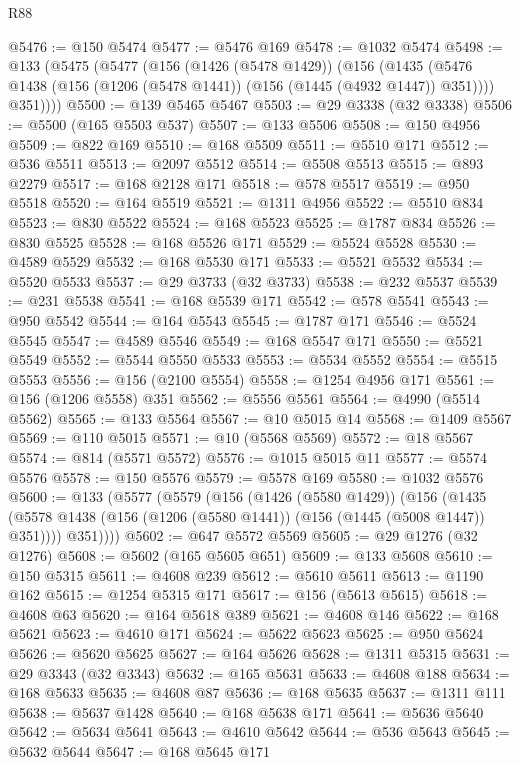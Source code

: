 \begin{lexlean}{R88}
\begin{coremodule}
@5476 := @150 @5474
@5477 := @5476 @169
@5478 := @1032 @5474
@5498 := @133
    (@5475
      (@5477
        (@156
          (@1426 (@5478 @1429))
          (@156
            (@1435 (@5476 @1438 (@156 (@1206 (@5478 @1441)) (@156 (@1445 (@4932 @1447)) @351))))
            @351))))
@5500 := @139 @5465 @5467
@5503 := @29 @3338 (@32 @3338)
@5506 := @5500 (@165 @5503 @537)
@5507 := @133 @5506
@5508 := @150 @4956
@5509 := @822 @169
@5510 := @168 @5509
@5511 := @5510 @171
@5512 := @536 @5511
@5513 := @2097 @5512
@5514 := @5508 @5513
@5515 := @893 @2279
@5517 := @168 @2128 @171
@5518 := @578 @5517
@5519 := @950 @5518
@5520 := @164 @5519
@5521 := @1311 @4956
@5522 := @5510 @834
@5523 := @830 @5522
@5524 := @168 @5523
@5525 := @1787 @834
@5526 := @830 @5525
@5528 := @168 @5526 @171
@5529 := @5524 @5528
@5530 := @4589 @5529
@5532 := @168 @5530 @171
@5533 := @5521 @5532
@5534 := @5520 @5533
@5537 := @29 @3733 (@32 @3733)
@5538 := @232 @5537
@5539 := @231 @5538
@5541 := @168 @5539 @171
@5542 := @578 @5541
@5543 := @950 @5542
@5544 := @164 @5543
@5545 := @1787 @171
@5546 := @5524 @5545
@5547 := @4589 @5546
@5549 := @168 @5547 @171
@5550 := @5521 @5549
@5552 := @5544 @5550 @5533
@5553 := @5534 @5552
@5554 := @5515 @5553
@5556 := @156 (@2100 @5554)
@5558 := @1254 @4956 @171
@5561 := @156 (@1206 @5558) @351
@5562 := @5556 @5561
@5564 := @4990 (@5514 @5562)
@5565 := @133 @5564
@5567 := @10 @5015 @14
@5568 := @1409 @5567
@5569 := @110 @5015
@5571 := @10 (@5568 @5569)
@5572 := @18 @5567
@5574 := @814 (@5571 @5572)
@5576 := @1015 @5015 @11
@5577 := @5574 @5576
@5578 := @150 @5576
@5579 := @5578 @169
@5580 := @1032 @5576
@5600 := @133
    (@5577
      (@5579
        (@156
          (@1426 (@5580 @1429))
          (@156
            (@1435 (@5578 @1438 (@156 (@1206 (@5580 @1441)) (@156 (@1445 (@5008 @1447)) @351))))
            @351))))
@5602 := @647 @5572 @5569
@5605 := @29 @1276 (@32 @1276)
@5608 := @5602 (@165 @5605 @651)
@5609 := @133 @5608
@5610 := @150 @5315
@5611 := @4608 @239
@5612 := @5610 @5611
@5613 := @1190 @162
@5615 := @1254 @5315 @171
@5617 := @156 (@5613 @5615)
@5618 := @4608 @63
@5620 := @164 @5618 @389
@5621 := @4608 @146
@5622 := @168 @5621
@5623 := @4610 @171
@5624 := @5622 @5623
@5625 := @950 @5624
@5626 := @5620 @5625
@5627 := @164 @5626
@5628 := @1311 @5315
@5631 := @29 @3343 (@32 @3343)
@5632 := @165 @5631
@5633 := @4608 @188
@5634 := @168 @5633
@5635 := @4608 @87
@5636 := @168 @5635
@5637 := @1311 @111
@5638 := @5637 @1428
@5640 := @168 @5638 @171
@5641 := @5636 @5640
@5642 := @5634 @5641
@5643 := @4610 @5642
@5644 := @536 @5643
@5645 := @5632 @5644
@5647 := @168 @5645 @171

\end{coremodule}
\end{lexlean}
